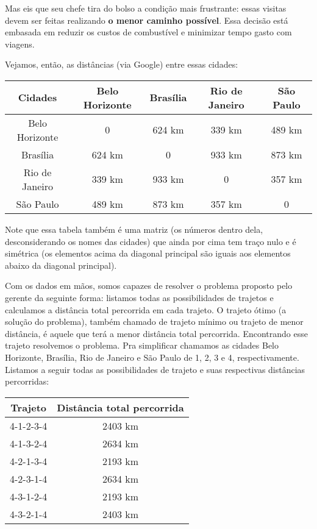 \documentclass[11pt]{article}
\begin{document}
Mas eis que seu chefe tira do bolso a condição mais frustrante: essas
visitas devem ser feitas realizando \textbf{o menor caminho possível}.
Essa decisão está embasada em reduzir os custos de combustível e
minimizar tempo gasto com viagens.

Vejamos, então, as distâncias (via Google) entre essas cidades:

\begin{longtable}[]{@{}ccccc@{}}
\toprule
Cidades & Belo Horizonte & Brasília & Rio de Janeiro & São Paulo \\
\midrule
\endhead
Belo Horizonte & 0 & 624 km & 339 km & 489 km \\
Brasília & 624 km & 0 & 933 km & 873 km \\
Rio de Janeiro & 339 km & 933 km & 0 & 357 km \\
São Paulo & 489 km & 873 km & 357 km & 0 \\
\bottomrule
\end{longtable}

Note que essa tabela também é uma matriz (os números dentro dela,
desconsiderando os nomes das cidades) que ainda por cima tem traço nulo
e é simétrica (os elementos acima da diagonal principal são iguais aos
elementos abaixo da diagonal principal).

Com os dados em mãos, somos capazes de resolver o problema proposto pelo
gerente da seguinte forma: listamos todas as possibilidades de trajetos
e calculamos a distância total percorrida em cada trajeto. O trajeto
ótimo (a solução do problema), também chamado de trajeto mínimo ou
trajeto de menor distância, é aquele que terá a menor distância total
percorrida. Encontrando esse trajeto resolvemos o problema. Pra
simplificar chamamos as cidades Belo Horizonte, Brasília, Rio de Janeiro
e São Paulo de 1, 2, 3 e 4, respectivamente. Listamos a seguir todas as
possibilidades de trajeto e suas respectivas distâncias percorridas:

\begin{longtable}[]{@{}cc@{}}
\toprule
Trajeto & Distância total percorrida \\
\midrule
\endhead
4-1-2-3-4 & 2403 km \\
4-1-3-2-4 & 2634 km \\
4-2-1-3-4 & 2193 km \\
4-2-3-1-4 & 2634 km \\
4-3-1-2-4 & 2193 km \\
4-3-2-1-4 & 2403 km \\
\bottomrule
\end{longtable}
\end{document}
